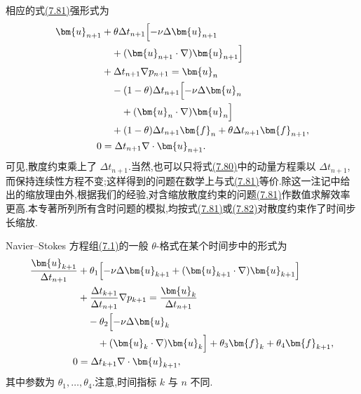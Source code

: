 \begin{note}[关于不可压缩约束]
\begin{itemize}
  相应的式\hyperref[eq:theta-scheme-variational]{(7.81)}强形式为
  \begin{equation}\label{eq:theta-scheme-strong}
  \begin{aligned}
    \bm{u}_{n+1}
    &+\theta\Delta t_{n+1}\Bigl[-\nu\Delta\bm{u}_{n+1}\\
    &\quad+(\bm{u}_{n+1}\cdot\nabla)\bm{u}_{n+1}\Bigr]\\
    &+\Delta t_{n+1}\nabla p_{n+1}=\bm{u}_n\\
    &\quad-(1-\theta)\Delta t_{n+1}\Bigl[-\nu\Delta\bm{u}_n\\
    &\qquad+(\bm{u}_n\cdot\nabla)\bm{u}_n\Bigr]\\
    &\quad+(1-\theta)\Delta t_{n+1}\bm{f}_n
       +\theta\Delta t_{n+1}\bm{f}_{n+1},\\
    0&=\Delta t_{n+1}\nabla\cdot\bm{u}_{n+1}.
  \end{aligned}
  \end{equation}
  可见,散度约束乘上了 $\Delta t_{n+1}$.当然,也可以只将式\hyperref[eq:theta-scheme-one-step]{(7.80)}中的动量方程乘以 $\Delta t_{n+1}$,而保持连续性方程不变;这样得到的问题在数学上与式\hyperref[eq:theta-scheme-variational]{(7.81)}等价.除这一注记中给出的缩放理由外,根据我们的经验,对含缩放散度约束的问题\hyperref[eq:theta-scheme-variational]{(7.81)}作数值求解效率更高.本专著所列所有含时问题的模拟,均按式\hyperref[eq:theta-scheme-variational]{(7.81)}或\hyperref[eq:theta-scheme-strong]{(7.82)}对散度约束作了时间步长缩放.
\end{itemize}
\end{note}

\begin{note}
\label{note:general-theta-scheme}
Navier--Stokes 方程组\hyperref[eq:time-dependent-ns-strong]{(7.1)}的一般 $\theta$-格式在某个时间步中的形式为
\begin{equation}\label{eq:general-theta-scheme}
\begin{aligned}
  \frac{\bm{u}_{k+1}}{\Delta t_{n+1}}
  &+\theta_1\Bigl[-\nu\Delta\bm{u}_{k+1}
       +(\bm{u}_{k+1}\cdot\nabla)\bm{u}_{k+1}\Bigr]\\
  &+\frac{\Delta t_{k+1}}{\Delta t_{n+1}}\nabla p_{k+1}
       =\frac{\bm{u}_k}{\Delta t_{n+1}}\\
  &\quad-\theta_2\Bigl[-\nu\Delta\bm{u}_k\\
  &\qquad+(\bm{u}_k\cdot\nabla)\bm{u}_k\Bigr]
       +\theta_3\bm{f}_k+\theta_4\bm{f}_{k+1},\\
  0&=\Delta t_{k+1}\nabla\cdot\bm{u}_{k+1},
\end{aligned}
\end{equation}
其中参数为 $\theta_1,\ldots,\theta_4$.注意,时间指标 $k$ 与 $n$ 不同.
\end{note}

